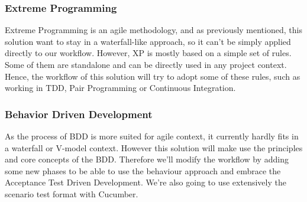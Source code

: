 \subsubsection{Extreme Programming}
Extreme Programming is an agile methodology, and as previously mentioned,
this solution want to stay in a waterfall-like approach, so it can't be
simply applied directly to our workflow.
However, XP is mostly based on a simple set of rules.
Some of them are standalone and can be directly used in any project context.
Hence, the workflow of this solution will try to adopt some of these rules,
such as working in TDD, Pair Programming or Continuous Integration.

\subsubsection{Behavior Driven Development}
As the process of BDD is more suited for agile context, it currently hardly
fits in a waterfall or V-model context.
However this solution will make use  the principles and core concepts of the
BDD\@.
Therefore we'll modify the workflow by adding some new phases to be able to
use the behaviour approach and embrace the Acceptance Test Driven Development.
We're also going to use extensively the scenario test format with Cucumber.